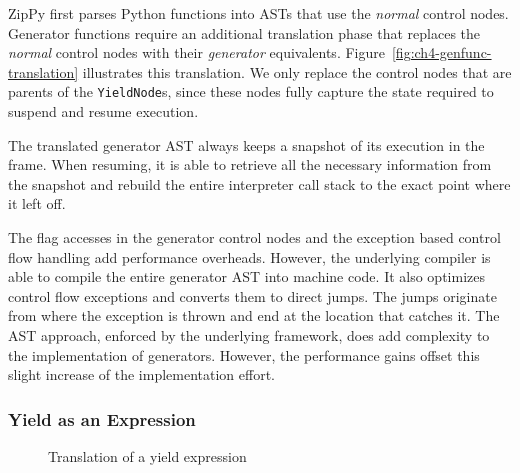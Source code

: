 ZipPy first parses Python functions into ASTs that use the \emph{normal} control nodes.
Generator functions require an additional translation phase that replaces the \emph{normal} control nodes with their \emph{generator} equivalents.
Figure~\ref{fig:ch4-genfunc-translation} illustrates this translation.
We only replace the control nodes that are parents of the \texttt{YieldNode}s, since these nodes fully capture the state required to suspend and resume execution.

The translated generator AST always keeps a snapshot of its execution in the frame.
When resuming, it is able to retrieve all the necessary information from the snapshot and rebuild the entire interpreter call stack to the exact point where it left off.

The flag accesses in the generator control nodes and the exception based control flow handling add performance overheads.
However, the underlying compiler is able to compile the entire generator AST into machine code.
It also optimizes control flow exceptions and converts them to direct jumps.
The jumps originate from where the exception is thrown and end at the location that catches it.
The AST approach, enforced by the underlying framework, does add complexity to the implementation of generators.
However, the performance gains offset this slight increase of the implementation effort.

\subsubsection*{Yield as an Expression}

\begin{figure}[h]
\centering
{}
\caption{Translation of a yield expression}
\label{fig:ch4-yield-expression}
\end{figure}

